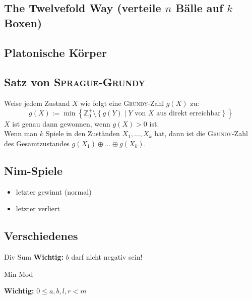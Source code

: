 \subsection{The Twelvefold Way \textnormal{(verteile $n$ Bälle auf $k$ Boxen)}}


\subsection{Platonische Körper}




\subsection{Satz von \textsc{Sprague-Grundy}}
Weise jedem Zustand $X$ wie folgt eine \textsc{Grundy}-Zahl $g\left(X\right)$ zu:
\[
g\left(X\right) := \min\left\{
\mathbb{Z}_0^+ \setminus
\left\{g\left(Y\right) \mid Y \text{ von } X \text{ aus direkt erreichbar}\right\}
\right\}
\]
$X$ ist genau dann gewonnen, wenn $g\left(X\right) > 0$ ist.\\
Wenn man $k$ Spiele in den Zuständen $X_1, \ldots, X_k$ hat, dann ist die \textsc{Grundy}-Zahl des Gesamtzustandes $g\left(X_1\right) \oplus \ldots \oplus g\left(X_k\right)$.

\subsection{Nim-Spiele}
\begin{itemize}
	\item[\ding{182}] letzter gewinnt (normal)
	\item[\ding{183}] letzter verliert
\end{itemize}


\subsection{Verschiedenes}


\begin{algorithm}{Div Sum}
	\textbf{Wichtig:} $b$ darf nicht negativ sein!
\end{algorithm}

\begin{algorithm}{Min Mod}
	\begin{methods}
		\method{minMod}{berechnet das Minimum von $(a \cdot i + b) \bmod{m}$ für $i \in [0, n)$}{\log(m)}
	\end{methods}
	\textbf{Wichtig:} $0 \leq a, b, l, r < m$
\end{algorithm}

